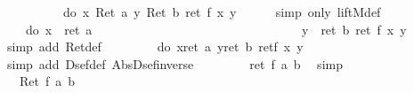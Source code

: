\begin{isabellebody}
\ \ \ \ \ \ \ \ {\isacharequal}\ {\isasymUp}\ {\isacharparenleft}do\ {\isacharbraceleft}x{\isasymleftarrow}{\isacharparenleft}{\isasymDown}\ {\isacharparenleft}Ret\ a{\isacharparenright}{\isacharparenright}{\isacharsemicolon}\ y{\isasymleftarrow}{\isacharparenleft}{\isasymDown}\ {\isacharparenleft}Ret\ b{\isacharparenright}{\isacharparenright}{\isacharsemicolon}\ ret\ {\isacharparenleft}f\ x\ y{\isacharparenright}{\isacharbraceright}{\isacharparenright}{\isachardoublequote}\isanewline
\ \ \ \ \isamarkupfalse%
\ {\isacharparenleft}simp\ only{\isacharcolon}\ liftM{}{\isacharunderscore}def{\isacharparenright}\isanewline
\ \ \isamarkupfalse%
\ \isamarkupfalse%
\ {\isachardoublequote}{\isasymdots}\ {\isacharequal}\ {\isasymUp}\ {\isacharparenleft}do\ {\isacharbraceleft}x{\isasymleftarrow}{\isacharparenleft}{\isasymDown}\ {\isacharparenleft}{\isasymUp}\ {\isacharparenleft}ret\ a{\isacharparenright}{\isacharparenright}{\isacharparenright}{\isacharsemicolon}\ \isanewline
\ \ \ \ \ \ \ \ \ \ \ \ \ \ \ \ \ \ \ \ \ \ \ \ \ \ \ \ \ \ \ \ y{\isasymleftarrow}{\isacharparenleft}{\isasymDown}\ {\isacharparenleft}{\isasymUp}\ {\isacharparenleft}ret\ b{\isacharparenright}{\isacharparenright}{\isacharparenright}{\isacharsemicolon}\ ret\ {\isacharparenleft}f\ x\ y{\isacharparenright}{\isacharbraceright}{\isacharparenright}{\isachardoublequote}\isanewline
\ \ \ \ \isamarkupfalse%
\ {\isacharparenleft}simp\ add{\isacharcolon}\ Ret{\isacharunderscore}def{\isacharparenright}\isanewline
\ \ \isamarkupfalse%
\ \isamarkupfalse%
\ {\isachardoublequote}{\isasymdots}\ {\isacharequal}\ {\isasymUp}\ {\isacharparenleft}do\ {\isacharbraceleft}x{\isasymleftarrow}ret\ a{\isacharsemicolon}\ y{\isasymleftarrow}ret\ b{\isacharsemicolon}\ ret{\isacharparenleft}f\ x\ y{\isacharparenright}{\isacharbraceright}{\isacharparenright}{\isachardoublequote}\isanewline
\ \ \ \ \isamarkupfalse%
\ {\isacharparenleft}simp\ add{\isacharcolon}\ Dsef{\isacharunderscore}def\ Abs{\isacharunderscore}Dsef{\isacharunderscore}inverse{\isacharparenright}\isanewline
\ \ \isamarkupfalse%
\ \isamarkupfalse%
\ {\isachardoublequote}{\isasymdots}\ {\isacharequal}\ {\isasymUp}\ {\isacharparenleft}ret\ {\isacharparenleft}f\ a\ b{\isacharparenright}{\isacharparenright}{\isachardoublequote}\ \isamarkupfalse%
\ simp\isanewline
\ \ \isamarkupfalse%
\ \isamarkupfalse%
\ {\isachardoublequote}{\isasymdots}\ {\isacharequal}\ Ret\ {\isacharparenleft}f\ a\ b{\isacharparenright}{\isachardoublequote}\ \isamarkupfalse%

\end{isabellebody}

